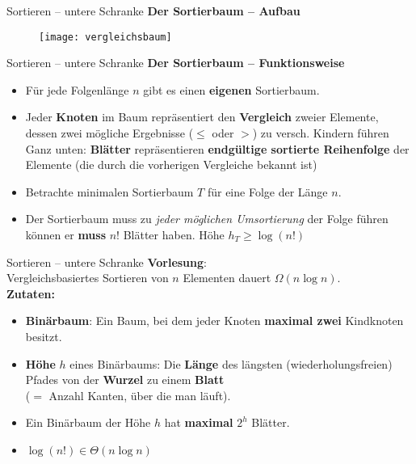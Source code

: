 \begin{frame}{Sortieren – untere Schranke}
	\textbf{Der Sortierbaum -- Aufbau}
	\begin{figure}[htp]
		\centering
		\texttt{[image: vergleichsbaum]}
	\end{figure}
\end{frame}

\begin{frame}{Sortieren – untere Schranke}
	\textbf{Der Sortierbaum -- Funktionsweise}
	\begin{itemize}
	\item Für jede Folgenlänge $n$ gibt es einen \textbf{eigenen} Sortierbaum.
	\item Jeder \textbf{Knoten} im Baum repräsentiert den \textbf{Vergleich} zweier Elemente, dessen zwei mögliche Ergebnisse ($\leq$ oder $>$) zu versch. Kindern führen
	\implitem Ganz unten: \textbf{Blätter} repräsentieren \textbf{endgültige sortierte Reihenfolge} der Elemente (die durch die vorherigen Vergleiche bekannt ist)
	
	\pause
	\medskip
	\item Betrachte minimalen Sortierbaum $T$ für eine Folge der Länge $n$.
	\item Der Sortierbaum muss zu \textit{jeder möglichen Umsortierung} der Folge führen können \impl er \textbf{muss} $n!$ Blätter haben.
	\implitem Höhe $h_T \geq \log(n!)$
	\end{itemize}
\end{frame}



\begin{frame}[t]{Sortieren – untere Schranke}
	\textbf{Vorlesung}: \\
	\quad Vergleichsbasiertes Sortieren von $n$ Elementen dauert $\Omega(n \log n)$. \\
	\bigskip
	\textbf{Zutaten:} 
	\begin{itemize}
		\item \textbf{Binärbaum}: Ein Baum, bei dem jeder Knoten \textbf{maximal zwei} Kindknoten besitzt.
		\item \textbf{Höhe} $h$ eines Binärbaums: Die \textbf{Länge} des längsten (wiederholungsfreien) Pfades von der \textbf{Wurzel} zu einem \textbf{Blatt} \\ {\small ($=$ Anzahl Kanten, über die man läuft)}. 
		\item Ein Binärbaum der Höhe $h$ hat \textbf{maximal} $2^h$  Blätter.
		\item \alert{$\log(n!) \in \Theta(n\log n)$}
	\end{itemize}	
\end{frame}

